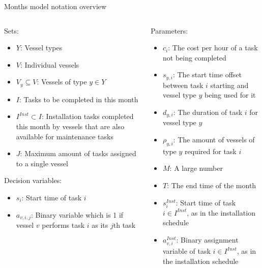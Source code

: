 \documentclass{beamer}
\begin{document}
\begin{frame}{Months model notation overview}
\footnotesize
\begin{columns}
\begin{column}{.48\textwidth}
Sets:
\begin{itemize}
\item $Y$: Vessel types
\item $V$: Individual vessels
\item $V_y \subseteq V$: Vessels of type $y \in Y$ 
\item $I$:  Tasks to be completed in this month
\item $I^{Inst} \subset I$:  Installation tasks completed this month by vessels that are also available for maintenance tasks
\item $J$: Maximum amount of tasks assigned to a single vessel
\end{itemize}

Decision variables:
\begin{itemize}
\item $s_i$: Start time of task $i$
\item $a_{v,i,j}$: Binary variable which is 1 if vessel $v$ performs task $i$ as its $j$th task
\end{itemize}
\end{column}

\hfill

\begin{column}{.48\textwidth}
Parameters:
\begin{itemize}
\item $c_i$: The cost per hour of a task not being completed
\item $s_{y,i}$: The start time offset between task $i$ starting and vessel type $y$ being used for it
\item $d_{y,i}$: The duration of task $i$ for vessel type $y$
\item $\rho_{y,i}$: The amount of vessels of type $y$ required for task $i$
\item $M$: A large number
\item $T$: The end time of the month
\item $s^{Inst}_i$: Start time of task $i \in I^{Inst}$, as in the installation schedule
\item $a^{Inst}_{v,i}$: Binary assignment variable of task $i \in I^{Inst}$, as in the installation schedule
\end{itemize}
\end{column}
\end{columns}
\end{frame}
\end{document}
